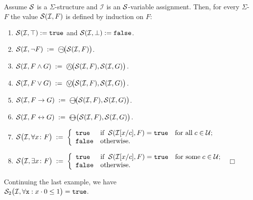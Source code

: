 \begin{Definition}
Assume $\mathcal{S}$ is a  $\Sigma$-structure and $\mathcal{I}$ is an  $\mathcal{S}$-variable assignment.
Then, for every  $\Sigma$-\formulae $F$ the value  $\mathcal{S}(\mathcal{I},F)$
is defined by induction on  $F$:
\begin{enumerate}
\item $\mathcal{S}(\mathcal{I},\top) := \mathtt{true}$ and $\mathcal{S}(\mathcal{I},\bot) := \mathtt{false}$.
\item $\struct(\mathcal{I}, \neg F) \;:=\; \circneg\bigl(\struct(\mathcal{I}, F)\bigr)$.
\item $\struct(\mathcal{I}, F \wedge G) \;:=\; \circwedge\bigl(\struct(\mathcal{I}, F), \struct(\mathcal{I}, G)\bigr)$.
\item $\struct(\mathcal{I}, F \vee G) \;:=\; \circvee\bigl(\struct(\mathcal{I}, F), \struct(\mathcal{I}, G)\bigr)$.
\item $\struct(\mathcal{I}, F \rightarrow G) \;:=\; \circright\!\bigl(\struct(\mathcal{I}, F), \struct(\mathcal{I}, G)\bigr)$.
\item $\struct(\mathcal{I}, F \leftrightarrow G) \;:=\; \circleftright\bigl(\struct(\mathcal{I}, F), \struct(\mathcal{I}, G)\bigr)$.
\item $\mathcal{S}\bigl(\mathcal{I}, \forall x\colon F\bigr) \;:=\; \left\{
  \begin{array}{ll}
     \mathtt{true}  & \mbox{if}\;\; \mathcal{S}(\mathcal{I}[x/c], F) = \mathtt{true}\quad \mbox{for
     all}\; c\in \mathcal{U}; \\
     \mathtt{false} & \mbox{otherwise}.
  \end{array}
  \right.$
\item $\mathcal{S}\bigl(\mathcal{I}, \exists x \colon F\bigr) \;:=\; \left\{
  \begin{array}{ll}
     \mathtt{true}  & \mbox{if}\;\; \mathcal{S}(\mathcal{I}[x/c], F) = \mathtt{true}\quad \mbox{for
       some}\; c\in \mathcal{U}; \\
     \mathtt{false} & \mbox{otherwise}.
  \end{array}
  \right.$\hspace*{\fill} $\Box$    
\end{enumerate}
\end{Definition}

\example
Continuing the last example, we have \\[0.2cm]
\hspace*{1.3cm}  $\mathcal{S}_2\bigl(\mathcal{I}, \forall \mathtt{x}: x \cdot  0 \leq 1 \bigr) = \mathtt{true}$.

